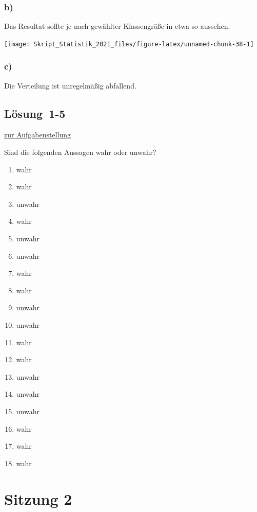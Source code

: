 \documentclass[
  11pt,
  ngerman,
  a4paper,
]{report}
\providecommand{\tightlist}{%
  \setlength{\itemsep}{0pt}\setlength{\parskip}{0pt}}
\begin{document}
\hypertarget{b-1}{%
\subsubsection{b)}\label{b-1}}

Das Resultat sollte je nach gewählter Klassengröße in etwa so aussehen:

\begin{center}\texttt{[image: Skript\_Statistik\_2021\_files/figure-latex/unnamed-chunk-38-1]} \end{center}

\hypertarget{c-1}{%
\subsubsection{c)}\label{c-1}}

Die Verteilung ist unregelmäßig abfallend.

\hypertarget{loesung-1-5}{%
\subsection{Lösung~1-5}\label{loesung-1-5}}

\protect\hyperlink{aufgabe-1-5}{zur Aufgabenstellung}

Sind die folgenden Aussagen wahr oder unwahr?

\begin{enumerate}
\def\labelenumi{\alph{enumi})}
\tightlist
\item
  wahr
\item
  wahr
\item
  unwahr
\item
  wahr
\item
  unwahr
\item
  unwahr
\item
  wahr
\item
  wahr
\item
  unwahr
\item
  unwahr
\item
  wahr
\item
  wahr
\item
  unwahr
\item
  unwahr
\item
  unwahr
\item
  wahr
\item
  wahr
\item
  wahr
\end{enumerate}

\hypertarget{sitzung-2}{%
\section*{Sitzung 2}\label{sitzung-2}}
\end{document}
